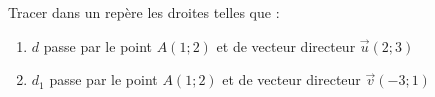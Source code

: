 
Tracer dans un repère \Oij les droites telles que :
\begin{enumerate}
\item $d$ passe par le point $A(1;2)$ et de vecteur directeur $\vec{u}(2;3)$
\item $d_1$ passe par le point $A(1;2)$ et de vecteur directeur $\vec{v}(-3;1)$
\end{enumerate}

